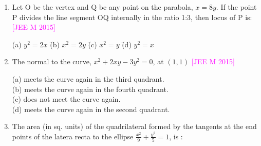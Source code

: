 \documentclass[journal,12pt,twocolumn]{IEEEtran}
\theoremstyle{remark}
\begin{document}
\begin{enumerate}[label=\textcolor{magenta}{\arabic*.}]
    \hfill{\textcolor{magenta}{[JEE M 2014]}}
    \begin{tabbing}
        (a) $\frac{1}{8}$ \hspace{2em} \= (b) $\frac{2}{3}$ \hspace{2em} \= (c) $\frac{1}{2}$ \hspace{2em} \= (d) $\frac{3}{2}$ \\
    \end{tabbing}
    \item Let O be the vertex and Q be any point on the parabola, $x=8y$. If the point P divides the line segment OQ internally in the ratio 1:3, then locus of P is:
    \hfill{\textcolor{magenta}{[JEE M 2015]}}
    \begin{tabbing}
        (a) $y^2=2x$ \hspace{0em} \= (b) $x^2=2y$ \hspace{0em} \= (c) $x^2=y$ \hspace{0em} \= (d) $y^2=x$ \\
    \end{tabbing}
    \item The normal to the curve, $x^2+2xy-3y^2=0$, at $(1,1)$
    \hfill{\textcolor{magenta}{[JEE M 2015]}}

    (a) meets the curve again in the third quadrant.\\
    (b) meets the curve again in the fourth quadrant.\\
    (c) does not meet the curve again.\\
    (d) meets the curve again in the second quadrant.\\
    \item The area (in sq. units) of the quadrilateral formed by the tangents at the end points of the latera recta to the ellipse $\frac{x^2}{9}+\frac{y^2}{5}=1$, is :
    

\end{enumerate}
\end{document}
